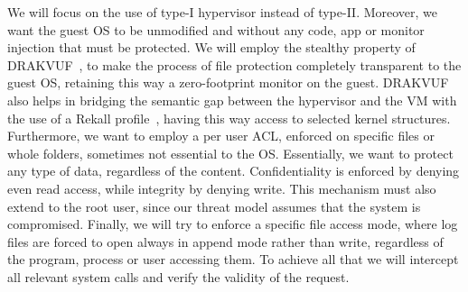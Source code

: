 \par We will focus on the use of type-I hypervisor instead of type-II. Moreover, we want the guest \ac{OS} to be unmodified and without any code, app or monitor injection that must be protected. We will employ the stealthy property of DRAKVUF~\cite{lengyel2014drakvuf}, to make the process of file protection completely transparent to the guest \ac{OS}, retaining this way a zero-footprint monitor on the guest. DRAKVUF also helps in bridging the semantic gap between the hypervisor and the \ac{VM} with the use of a Rekall profile~\cite{rekall}, having this way access to selected kernel structures. Furthermore, we want to employ a per user \ac{ACL}, enforced on specific files or whole folders, sometimes not essential to the \ac{OS}. Essentially, we want to protect any type of data, regardless of the content. Confidentiality is enforced by denying even read access, while integrity by denying write. This mechanism must also extend to the root user, since our threat model assumes that the system is compromised. Finally, we will try to enforce a specific file access mode, where log files are forced to open always in append mode rather than write, regardless of the program, process or user accessing them. To achieve all that we will intercept all relevant system calls and verify the validity of the request. 

